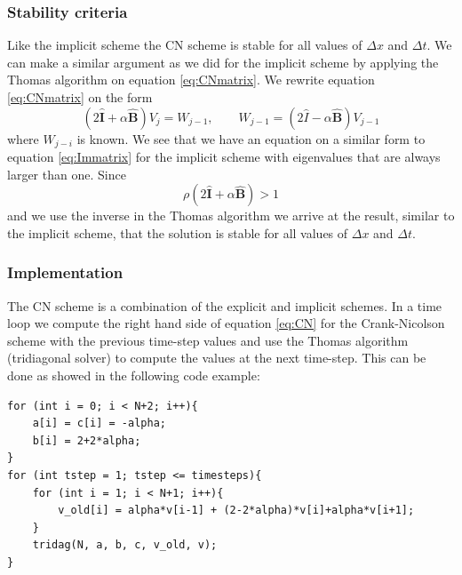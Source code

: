 \documentclass[%
 reprint,
nofootinbib,
aps,
]{revtex4-1}
\renewcommand{\vec}[1]{\mathbf{#1}} %
\begin{document}
\subsubsection{Stability criteria}
Like the implicit scheme the CN scheme is stable for all values of $\Delta x$ and $\Delta t$. We can make a similar argument as we did for the implicit scheme by applying the Thomas algorithm on equation \ref{eq:CNmatrix}. We rewrite equation \ref{eq:CNmatrix} on the form $$(2{\hat{\vec{I}}} + \alpha {\hat{\vec{B}}})V_j = W_{j-1} , \qquad W_{j-1} = (2\hat{I} - \alpha \hat{\vec{B}})V_{j-1}$$
where ${W_{j-i}}$ is known. We see that we have an equation on a similar form to equation \ref{eq:Immatrix} for the implicit scheme with eigenvalues that are always larger than one. Since $$\rho(2{\hat{\vec{I}}} + \alpha {\hat{\vec{B}}})>1$$ and we use the inverse in the Thomas algorithm we arrive at the result, similar to the implicit scheme, that the solution is stable for all values of $\Delta x$ and $\Delta t$.


\subsubsection{Implementation}
The CN scheme is a combination of the explicit and implicit schemes. In a time loop we compute the right hand side of equation \ref{eq:CN} for the Crank-Nicolson scheme with the previous time-step values and use the Thomas algorithm (tridiagonal solver) to compute the values at the next time-step. This can be done as showed in the following code example:
\begin{verbatim}
for (int i = 0; i < N+2; i++){
	a[i] = c[i] = -alpha;
	b[i] = 2+2*alpha;
}
for (int tstep = 1; tstep <= timesteps){
	for (int i = 1; i < N+1; i++){
		v_old[i] = alpha*v[i-1] + (2-2*alpha)*v[i]+alpha*v[i+1];
	}
	tridag(N, a, b, c, v_old, v);
}
\end{verbatim}
\end{document}
